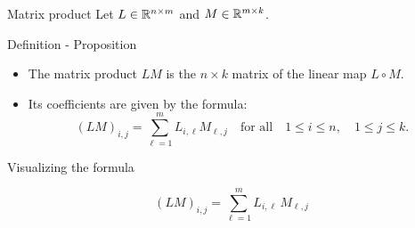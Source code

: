 \documentclass{beamer}
\begin{document}
\begin{frame}[t]{Matrix product}
	Let $L \in \mathbb{R}^{n \times m}$ and $M \in \mathbb{R}^{m \times k}$. 
	\vspace{1.5cm}
	\begin{block}{Definition - Proposition}
		\begin{itemize}
			\item The matrix product $LM$ is the $n \times k$ matrix of the linear map $L \circ M$.
				\vspace{0.1cm}
			\item Its coefficients are given by the formula:
		\vspace{-0.2cm}
				$$
				(LM)_{i,j} = \sum_{\ell=1}^m L_{i,\ell} M_{\ell,j} \quad \text{for all} \quad 1 \leq i \leq n, \quad 1 \leq j \leq k.
				$$
		\end{itemize}
		\vspace{-0.4cm}
	\end{block}
\end{frame}
\begin{frame}[t]{Visualizing the formula}
	\vspace{-0.9cm}
	\begin{exampleblock}{}
		\vspace{-0.4cm}
		$$
		(LM)_{i,j} = \sum_{\ell=1}^m L_{i,\ell} \, M_{\ell,j} 
		$$
		\vspace{-0.3cm}
	\end{exampleblock}
\end{frame}
\end{document}
